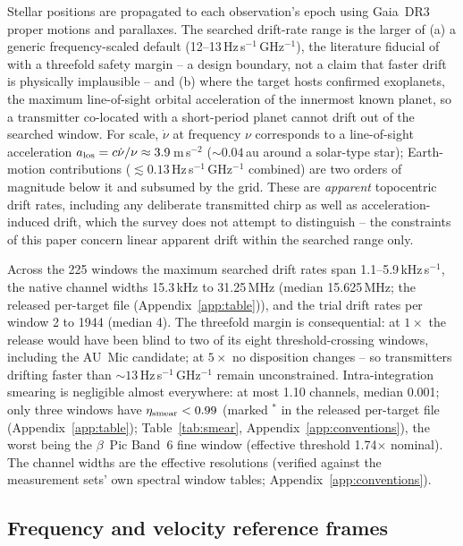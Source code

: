 \documentclass{openjournal}
\begin{document}
Stellar positions are propagated to each observation's epoch using
Gaia~DR3 proper motions and parallaxes. The searched drift-rate range
is the larger of (a) a generic frequency-scaled default
(12--13\,Hz\,s$^{-1}$\,GHz$^{-1}$), the literature fiducial of
\citet{Mason2024} with a threefold safety margin -- a design
boundary, not a claim that faster drift is physically implausible --
and (b) where the target hosts confirmed exoplanets, the maximum
line-of-sight orbital acceleration of the innermost known planet, so
a transmitter co-located with a short-period planet cannot drift out
of the searched window. For scale, $\dot\nu$ at frequency $\nu$
corresponds to a line-of-sight acceleration $a_{\rm los} =
c\dot\nu/\nu \approx 3.9$\,m\,s$^{-2}$ (${\sim}0.04$\,au around a
solar-type star); Earth-motion contributions
($\lesssim0.13$\,Hz\,s$^{-1}$\,GHz$^{-1}$ combined) are two orders of
magnitude below it and subsumed by the grid. These are
\emph{apparent} topocentric drift rates, including any deliberate
transmitted chirp as well as acceleration-induced drift, which the
survey does not attempt to distinguish -- the constraints of this
paper concern linear apparent drift within the searched range only.

Across the 225 windows the maximum searched drift rates span
1.1--5.9\,kHz\,s$^{-1}$, the native channel widths 15.3\,kHz to
31.25\,MHz (median 15.625\,MHz; the released per-target file (Appendix~\ref{app:table})), and the trial
drift rates per window 2 to 1944 (median 4). The threefold margin is
consequential: at $1\times$ the release would have been blind to two
of its eight threshold-crossing windows, including the AU~Mic
candidate; at $5\times$ no disposition changes -- so transmitters
drifting faster than
${\sim}13$\,Hz\,s$^{-1}$\,GHz$^{-1}$ remain unconstrained.
Intra-integration smearing is negligible almost everywhere: at most
1.10 channels, median 0.001; only three windows have
$\eta_{\rm smear} < 0.99$ (marked $^{\ast}$ in the released per-target file (Appendix~\ref{app:table});
Table~\ref{tab:smear}, Appendix~\ref{app:conventions}), the worst
being the $\beta$~Pic Band~6 fine window (effective threshold
1.74$\times$ nominal). The channel widths are the effective
resolutions (verified against the measurement sets' own spectral
window tables; Appendix~\ref{app:conventions}).

\subsection{Frequency and velocity reference frames}
\label{sec:frames}
\end{document}
